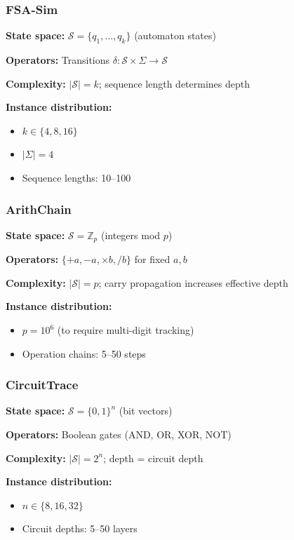 \documentclass{article}
\theoremstyle{plain}
\theoremstyle{definition}
\theoremstyle{remark}
\begin{document}
\subsubsection{FSA-Sim}

\textbf{State space:} $\mathcal{S} = \{q_1, \ldots, q_k\}$ (automaton states)

\textbf{Operators:} Transitions $\delta: \mathcal{S} \times \Sigma \to \mathcal{S}$

\textbf{Complexity:} $|\mathcal{S}| = k$; sequence length determines depth

\textbf{Instance distribution:}
\begin{itemize}
\item $k \in \{4, 8, 16\}$
\item $|\Sigma| = 4$
\item Sequence lengths: 10--100
\end{itemize}

\subsubsection{ArithChain}

\textbf{State space:} $\mathcal{S} = \mathbb{Z}_p$ (integers mod $p$)

\textbf{Operators:} $\{+a, -a, \times b, /b\}$ for fixed $a, b$

\textbf{Complexity:} $|\mathcal{S}| = p$; carry propagation increases effective depth

\textbf{Instance distribution:}
\begin{itemize}
\item $p = 10^6$ (to require multi-digit tracking)
\item Operation chains: 5--50 steps
\end{itemize}

\subsubsection{CircuitTrace}

\textbf{State space:} $\mathcal{S} = \{0, 1\}^n$ (bit vectors)

\textbf{Operators:} Boolean gates (AND, OR, XOR, NOT)

\textbf{Complexity:} $|\mathcal{S}| = 2^n$; depth = circuit depth

\textbf{Instance distribution:}
\begin{itemize}
\item $n \in \{8, 16, 32\}$
\item Circuit depths: 5--50 layers
\end{itemize}
\end{document}
